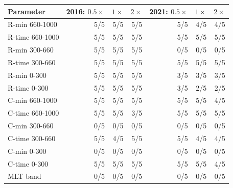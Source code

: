 \begin{tabular}{@{}lrrrrrr@{}}
\toprule
Parameter & 2016: $0.5\times$ & $1\times$ & $2\times$ & 2021: $0.5\times$ & $1\times$ & $2\times$ \\
\midrule
R-min 660-1000 & 5/5 & 5/5 & 5/5 & 5/5 & 4/5 & 4/5 \\
R-time 660-1000 & 5/5 & 5/5 & 5/5 & 5/5 & 5/5 & 5/5 \\
R-min 300-660 & 5/5 & 5/5 & 5/5 & 0/5 & 0/5 & 0/5 \\
R-time 300-660 & 5/5 & 5/5 & 5/5 & 5/5 & 5/5 & 5/5 \\
R-min 0-300 & 5/5 & 5/5 & 5/5 & 3/5 & 3/5 & 3/5 \\
R-time 0-300 & 5/5 & 5/5 & 5/5 & 3/5 & 2/5 & 2/5 \\
C-min 660-1000 & 5/5 & 5/5 & 5/5 & 5/5 & 5/5 & 4/5 \\
C-time 660-1000 & 5/5 & 5/5 & 3/5 & 5/5 & 5/5 & 5/5 \\
C-min 300-660 & 0/5 & 0/5 & 0/5 & 0/5 & 0/5 & 0/5 \\
C-time 300-660 & 5/5 & 4/5 & 5/5 & 5/5 & 4/5 & 4/5 \\
C-min 0-300 & 0/5 & 0/5 & 0/5 & 0/5 & 0/5 & 0/5 \\
C-time 0-300 & 5/5 & 5/5 & 5/5 & 5/5 & 5/5 & 4/5 \\
MLT band & 0/5 & 0/5 & 0/5 & 0/5 & 0/5 & 0/5 \\
\bottomrule
\end{tabular}
